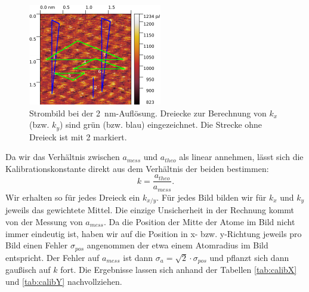 \begin{figure}[H]
\centering
\includegraphics[width=\textwidth]{../Gwyddion/HOPG/2nm_gimped.pdf}
\caption{Strombild bei der \SI{2}{nm}-Auflösung. Dreiecke zur Berechnung von $k_x$ (bzw. $k_y$) sind grün (bzw. blau) eingezeichnet. Die Strecke ohne Dreieck ist mit 2 markiert.}
\label{2nm}
\end{figure}

Da wir das Verhältnis zwischen $a_{mess}$ und $a_{theo}$ als linear annehmen, lässt sich die Kalibrationskonstante direkt aus dem Verhältnis der beiden bestimmen:
\begin{equation}
k = \frac{a_{theo}}{a_{mess}}.
\end{equation}
Wir erhalten so für jedes Dreieck ein $k_{x/y}$. Für jedes Bild bilden wir für $k_x$ und $k_y$ jeweils das gewichtete Mittel. Die einzige Unsicherheit in der Rechnung kommt von der Messung von $a_{mess}$. Da die Position der Mitte der Atome im Bild nicht immer eindeutig ist, haben wir auf die Position in x- bzw. y-Richtung jeweils pro Bild einen Fehler $\sigma_{pos}$ angenommen der etwa einem Atomradius im Bild entspricht. Der Fehler auf $a_{mess}$ ist dann $\sigma_a = \sqrt{2} \cdot \sigma_{pos}$ und pflanzt sich dann gaußisch auf $k$ fort. Die Ergebnisse lassen sich anhand der Tabellen \ref{tab:calibX} und \ref{tab:calibY} nachvollziehen.


